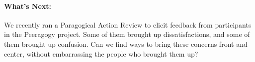 \paragraph{What's Next:} We recently ran a Paragogical Action Review to
elicit feedback from participants in the Peeragogy project. Some of them
brought up dissatisfactions, and some of them brought up confusion. Can
we find ways to bring these concerns front-and-center, without
embarrassing the people who brought them up?
